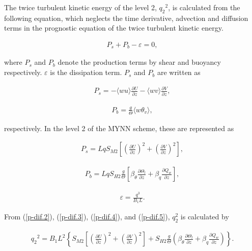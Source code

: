 The twice turbulent kinetic energy of the level 2, \({q_2}^2\), is
calculated from the following equation, which neglects the time
derivative, advection and diffusion terms in the prognostic equation of
the twice turbulent kinetic energy.

\begin{eqnarray} P_s + P_b - \varepsilon = 0 \label{p-dif.2}, \end{eqnarray}

where \(P_s\) and \(P_b\) denote the production terms by shear and
buoyancy respectively. \(\varepsilon\) is the dissipation term. \(P_s\)
and \(P_b\) are written as

\begin{eqnarray} P_s = -\langle wu \rangle \frac{\partial U}{\partial z} - \langle wv \rangle \frac{\partial V}{\partial z}, \end{eqnarray}

\begin{eqnarray} P_b = \frac{g}{\Theta}\langle w\theta_v \rangle, \end{eqnarray}

respectively. In the level 2 of the MYNN scheme, these are represented
as

\begin{eqnarray} P_s = LqS_{M2} \left[ \left(\frac{\partial U}{\partial z}\right)^2 + \left(\frac{\partial V}{\partial z}\right)^2 \right] \label{p-dif.3}, \end{eqnarray}

\begin{eqnarray} P_b = LqS_{H2} \frac{g}{\Theta}\left[ \beta_\theta \frac{\partial \Theta_l}{\partial z} + \beta_q \frac{\partial Q_w}{\partial z} \right] \label{p-dif.4}, \end{eqnarray}

\begin{eqnarray} \varepsilon = \frac{q^3}{B_1 L} \label{p-dif.5}. \end{eqnarray}

From (\ref{p-dif.2}), (\ref{p-dif.3}), (\ref{p-dif.4}), and
(\ref{p-dif.5}), \(q_2^2\) is calculated by

\begin{eqnarray}{q_2}^2=B_1L^2\left\{S_{M2}\left[\left(\frac{\partial U}{\partial z}\right)^2+\left(\frac{\partial V}{\partial z}\right)^2\right]+S_{H2}\frac{g}{\Theta}\left(\beta_\theta \frac{\partial \Theta_l}{\partial z}+\beta_q \frac{\partial Q_w}{\partial z}\right)\right\}.\end{eqnarray}

